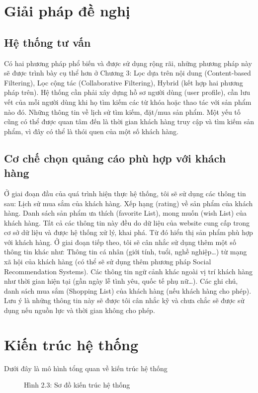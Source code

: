 \documentclass[a4paper,12pt,numbered,print,index,custombib, oneside, custommargin]{report}
\begin{document}
\section{Giải pháp đề nghị}
\subsection{Hệ thống tư vấn}
Có hai phương pháp phổ biến và được sử dụng rộng rãi, những phương pháp này sẽ được trình bày cụ thể hơn ở Chương 3: Lọc dựa trên nội dung (Content-based Filtering), Lọc cộng tác (Collaborative Filtering), Hybrid (kết hợp hai phương pháp trên).
Hệ thống cần phải xây dựng hồ sơ người dùng (user profile), cần lưu vết của mỗi người dùng khi họ tìm kiếm các từ khóa hoặc thao tác với sản phẩm nào đó. Những thông tin về lịch sử tìm kiếm, đặt/mua sản phẩm. Một yếu tố cũng có thể được quan tâm đến là thời gian khách hàng truy cập và tìm kiếm sản phẩm, vì đây có thể là thói quen của một số khách hàng.

\subsection{Cơ chế chọn quảng cáo phù hợp với khách hàng}
Ở giai đoạn đầu của quá trình hiện thực hệ thống, tôi sẽ sử dụng các thông tin sau: Lịch sử mua sắm của khách hàng. Xếp hạng (rating) về sản phẩm của khách hàng. Danh sách sản phẩm ưa thích (favorite List), mong muốn (wish List) của khách hàng.
Tất cả các thông tin này đều do dữ liệu của website cung cấp trong cơ sở dữ liệu và được hệ thống xử lý, khai phá. Từ đó hiển thị sản phẩm phù hợp với khách hàng.
Ở giai đoạn tiếp theo, tôi sẽ cân nhắc sử dụng thêm một số thông tin khác như: Thông tin cá nhân (giới tính, tuổi, nghề nghiệp…) từ mạng xã hội của khách hàng (có thể sẽ sử dụng thêm phương pháp Social Recommendation Systems).
Các thông tin ngữ cảnh khác ngoài vị trí khách hàng như thời gian hiện tại (gần ngày lễ tình yêu, quốc tế phụ nữ…). Các ghi chú, danh sách mua sắm (Shopping List) của khách hàng (nếu khách hàng cho phép).
Lưu ý là những thông tin này sẽ được tôi cân nhắc kỹ và chưa chắc sẽ được sử dụng nếu nguồn lực và thời gian không cho phép.
\section{Kiến trúc hệ thống}
Dưới đây là mô hình tổng quan về kiến trúc hệ thống

\begin{figure}[h]
\centering
\caption{Hình 2.3: Sơ đồ kiến trúc hệ thống}
\end{figure}
\end{document}
